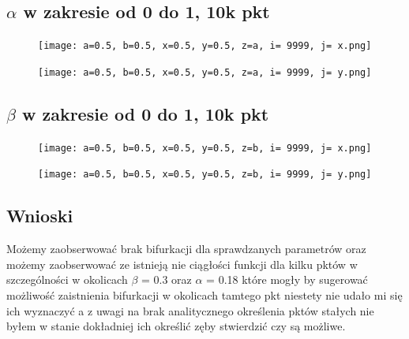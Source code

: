 \documentclass{article}
\begin{document}
    \newpage
    \subsection{$\alpha$ w zakresie od 0 do 1, 10k pkt}
    \begin{figure}[ht]
        \centering
        \begin{minipage}{.5\textwidth}
            \centering
            \texttt{[image: a=0.5, b=0.5, x=0.5, y=0.5, z=a, i= 9999, j= x.png]}
            \label{fig:test11}
        \end{minipage}%
        \begin{minipage}{.5\textwidth}
            \centering
            \texttt{[image: a=0.5, b=0.5, x=0.5, y=0.5, z=a, i= 9999, j= y.png]}
            \label{fig:test12}
        \end{minipage}
    \end{figure}

        \subsection{$\beta$ w zakresie od 0 do 1, 10k pkt}
    \begin{figure}[ht]
        \centering
        \begin{minipage}{.5\textwidth}
            \centering
            \texttt{[image: a=0.5, b=0.5, x=0.5, y=0.5, z=b, i= 9999, j= x.png]}
            \label{fig:test11}
        \end{minipage}%
        \begin{minipage}{.5\textwidth}
            \centering
            \texttt{[image: a=0.5, b=0.5, x=0.5, y=0.5, z=b, i= 9999, j= y.png]}
            \label{fig:test12}
        \end{minipage}
    \end{figure}

    \newpage

    \subsection{Wnioski}
        Możemy zaobserwować brak bifurkacji dla sprawdzanych parametrów oraz możemy zaobserwować ze istnieją nie ciągłości funkcji dla kilku pktów w szczególności w okolicach $\beta$ = 0.3 oraz $\alpha$ = 0.18 które mogły by sugerować możliwość zaistnienia bifurkacji w okolicach tamtego pkt niestety nie udało mi się ich wyznaczyć a z uwagi na brak analitycznego określenia pktów stałych nie byłem w stanie dokładniej ich określić zęby stwierdzić czy są możliwe.
\end{document}
